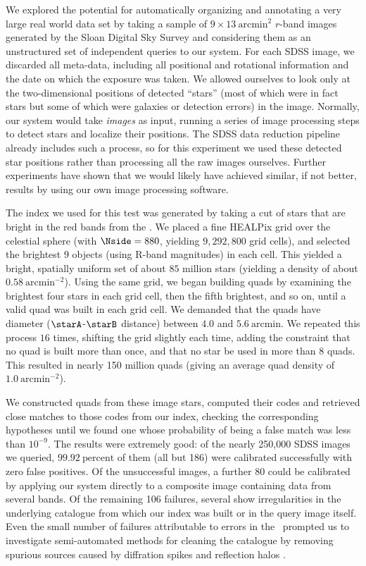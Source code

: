 \documentclass[12pt,preprint]{aastex}
\newcommand{\unit}[1]{\mathrm{#1}}
\newcommand{\percent}{\unit{percent}}
\renewcommand{\%}{\percent}
\renewcommand{\arcmin}{\unit{arcmin}}
\begin{document}
We explored the potential for automatically organizing and annotating
a very large real world data set by taking a sample of
$9\times13~\arcmin^2$ $r$-band images generated by the Sloan Digital Sky
Survey \citep{sdss} and considering them as an unstructured set of
independent queries to our system.  For each SDSS image, we discarded
all meta-data, including all positional and rotational information and
the date on which the exposure was taken.  We allowed ourselves to
look only at the two-dimensional positions of detected ``stars'' (most
of which were in fact stars but some of which were galaxies or
detection errors) in the image.  Normally, our system would take
\emph{images} as input, running a series of image processing steps to
detect stars and localize their positions.  The SDSS data reduction
pipeline already includes such a process, so for this experiment we
used these detected star positions rather than processing all the raw
images ourselves.  Further experiments have shown that we would likely
have achieved similar, if not better, results by using our own image
processing software.

The index we used for this test was generated by taking a cut
of stars that are bright in the red bands from the \USNOB.
We placed a fine HEALPix \citep{healpix} grid
over the celestial sphere (with $\Nside=880$, yielding $9,292,800$
grid cells), and selected the brightest $9$ objects (using R-band
magnitudes) in each cell.  This yielded a bright, spatially uniform
set of about $85$ million stars (yielding a density of about
$0.58~\arcmin^{-2}$).
 Using the same grid, we began building quads by examining the
brightest four stars in each grid cell, then the fifth brightest, and
so on, until a valid quad was built in each grid cell.  We demanded
that the quads have diameter ($\starA$-$\starB$ distance) between $4.0$ and
$5.6~\arcmin$.  We repeated this process $16$ times, shifting the
grid slightly each time, adding the constraint that no quad is built
more than once, and that no star be used in more than $8$ quads.  This
resulted in nearly 150 million quads (giving an average quad density
of $1.0~\arcmin^{-2}$).

We constructed quads from these image stars, computed their codes and
retrieved close matches to those codes from our index, checking the
corresponding hypotheses until we found one whose probability of being
a false match was less than $10^{-9}$. The results were extremely
good: of the nearly 250,000 SDSS images we queried, $99.92~\percent$ of them
(all but 186) were calibrated successfully with zero false
positives. Of the unsuccessful images, a further 80 could be
calibrated by applying our system directly to a composite image
containing data from several bands. Of the remaining 106 failures,
several show irregularities in the underlying catalogue from which our
index was built or in the query image itself.  Even the small number
of failures attributable to errors in the \USNOB\ prompted us
to investigate semi-automated methods for cleaning the catalogue by
removing spurious sources caused by diffration spikes and reflection
halos \citep{barron}.
\end{document}
